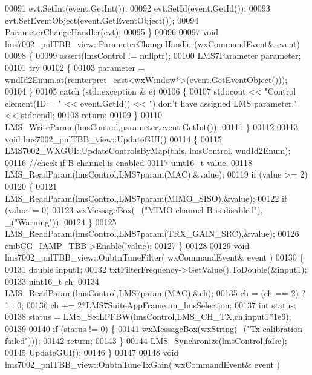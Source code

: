 \begin{DoxyCode}
{00091     evt.SetInt(event.GetInt());
00092     evt.SetId(event.GetId());
00093     evt.SetEventObject(event.GetEventObject());
00094     ParameterChangeHandler(evt);
00095 \}
00096 
00097 \textcolor{keywordtype}{void} lms7002_pnlTBB_view::ParameterChangeHandler(wxCommandEvent& event)
00098 \{
00099     assert(lmsControl != \textcolor{keyword}{nullptr});
00100     LMS7Parameter parameter;
00101     \textcolor{keywordflow}{try}
00102     \{
00103         parameter = wndId2Enum.at(reinterpret\_cast<wxWindow*>(event.GetEventObject()));
00104     \}
00105     \textcolor{keywordflow}{catch} (std::exception & e)
00106     \{
00107         std::cout << \textcolor{stringliteral}{"Control element(ID = "} << \textcolor{keyword}{event}.GetId() << \textcolor{stringliteral}{") don't have assigned LMS parameter."} << 
      std::endl;
00108         \textcolor{keywordflow}{return};
00109     \}
00110     LMS_WriteParam(lmsControl,parameter,event.GetInt());
00111 \}
00112 
00113 \textcolor{keywordtype}{void} lms7002_pnlTBB_view::UpdateGUI()
00114 \{
00115     LMS7002_WXGUI::UpdateControlsByMap(\textcolor{keyword}{this}, lmsControl, wndId2Enum);
00116     \textcolor{comment}{//check if B channel is enabled}
00117     uint16\_t value;
00118     LMS_ReadParam(lmsControl,LMS7param(MAC),&value);
00119     \textcolor{keywordflow}{if} (value >= 2)
00120     \{
00121         LMS_ReadParam(lmsControl,LMS7param(MIMO_SISO),&value);
00122         \textcolor{keywordflow}{if} (value != 0)
00123             wxMessageBox(\_(\textcolor{stringliteral}{"MIMO channel B is disabled"}), \_(\textcolor{stringliteral}{"Warning"}));
00124     \}
00125     LMS_ReadParam(lmsControl,LMS7param(TRX_GAIN_SRC),&value);
00126     cmbCG_IAMP_TBB->Enable(!value);
00127 \}
00128 
00129 \textcolor{keywordtype}{void} lms7002_pnlTBB_view::OnbtnTuneFilter( wxCommandEvent& event )
00130 \{
00131     \textcolor{keywordtype}{double} input1;
00132     txtFilterFrequency->GetValue().ToDouble(&input1);
00133     uint16\_t ch;
00134     LMS_ReadParam(lmsControl,LMS7param(MAC),&ch);
00135     ch = (ch == 2) ? 1 : 0;
00136     ch += 2*LMS7SuiteAppFrame::m_lmsSelection;
00137     \textcolor{keywordtype}{int} status;
00138     status = LMS_SetLPFBW(lmsControl,LMS_CH_TX,ch,input1*1e6);
00139 
00140     \textcolor{keywordflow}{if} (status != 0) \{
00141         wxMessageBox(wxString(\_(\textcolor{stringliteral}{"Tx calibration failed"})));
00142         \textcolor{keywordflow}{return};
00143     \}
00144     LMS_Synchronize(lmsControl,\textcolor{keyword}{false});
00145     UpdateGUI();
00146 \}
00147 
00148 \textcolor{keywordtype}{void} lms7002_pnlTBB_view::OnbtnTuneTxGain( wxCommandEvent& event )
}
\end{DoxyCode}

